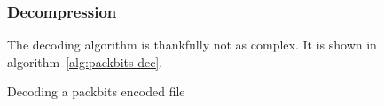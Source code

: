 \subsubsection{Decompression}

  The decoding algorithm is thankfully not as complex. It is shown in
  algorithm~\ref{alg:packbits-dec}.

\begin{algorithm}
  \caption{Decoding a \rle packbits encoded file}\algohack{}
  \label{alg:packbits-dec}
  \begin{algorithmic}[1]


    \While{\neof}



        \State {}
        \EndRepeatn
      \Else

        \State {}
        \EndRepeatn

      \EndIf


    \EndWhile
  \end{algorithmic}
\end{algorithm}

\FloatBarrier

\answers{}

